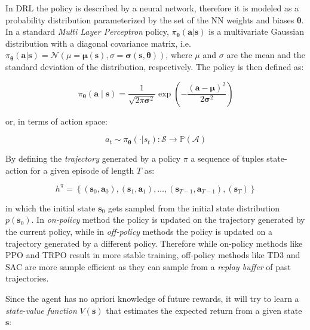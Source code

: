 In \ac{DRL} the policy is described by a neural network, therefore it is modeled as a probability distribution parameterized by the set of the \ac{NN} weights and biases $\boldsymbol{\theta}$. In a standard \textit{Multi Layer Perceptron} policy, $\pi _{\boldsymbol{\theta}}(\mathbf{a} | \mathbf{s})$ is a multivariate Gaussian distribution with a diagonal covariance matrix, i.e. $\pi _{\boldsymbol{\theta}}(\mathbf{a} | \mathbf{s}) = \mathcal{N}(\mu = \boldsymbol{\mu}(\mathbf{s}), \sigma = \boldsymbol{\sigma}(\mathbf{s}, \boldsymbol{\theta}))$, where $\mu$ and $\sigma$ are the mean and the standard deviation of the distribution, respectively. The policy is then defined as:

\begin{equation}
    \pi _{\boldsymbol{\theta}}(\mathbf{a} \mid \mathbf{s}) = \frac{1}{\sqrt{2 \pi \boldsymbol{\sigma} ^2}} \exp \left(- \frac{(\mathbf{a} - \boldsymbol{\mu}) ^2}{2 \boldsymbol{\sigma} ^2} \right)
\end{equation}

or, in terms of action space:

\begin{equation}
    a _t \sim \pi _{\boldsymbol{\theta}}(\cdot | s_t): \mathcal{S} \rightarrow \mathbb{P}(\mathcal{A})
\end{equation}

By defining the \textit{trajectory} generated by a policy $\pi$ a sequence of tuples state-action for a given episode of length $T$ as:

\begin{equation}
    h ^{\pi} = \left\{ (\mathbf{s} _0, \mathbf{a} _0), (\mathbf{s} _1, \mathbf{a} _1), \dots, (\mathbf{s} _{T-1}, \mathbf{a} _{T-1}), (\mathbf{s} _T) \right\}
\end{equation}

in which the initial state $\mathbf{s} _0$ gets sampled from the initial state distribution $p(\mathbf{s} _0)$.
In \textit{on-policy} method the policy is updated on the trajectory generated by the current policy, while in \textit{off-policy} methods the policy is updated on a trajectory generated by a different policy. Therefore while on-policy methods like \ac{PPO} and \ac{TRPO} result in more stable training, off-policy methods like \ac{TD3} and \ac{SAC} are more sample efficient as they can sample from a \textit{replay buffer} of past trajectories.

Since the agent has no apriori knowledge of future rewards, it will try to learn a \textit{state-value function} $V(\mathbf{s})$ that estimates the expected return from a given state $\mathbf{s}$:

